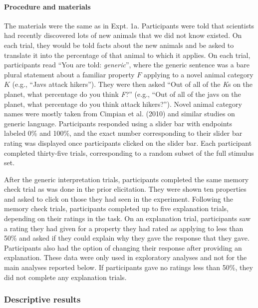 \documentclass[floatsintext,doc]{apa6}
\let\oldparagraph\paragraph
\renewcommand{\paragraph}[1]{\oldparagraph{#1}\mbox{}}
\begin{document}
\hypertarget{procedure-and-materials-2}{%
\paragraph{Procedure and materials}\label{procedure-and-materials-2}}
%
The materials were the same as in Expt. 1a.
Participants were told that scientists had recently discovered lots of new animals that we did not know existed.
On each trial, they would be told facts about the new animals and be asked to translate it into the percentage of that animal to which it applies.
On each trial, participants read \enquote{You are told: \emph{generic}}, where the generic sentence was a bare plural statement about a familiar property \(F\) applying to a novel animal category \(K\) (e.g., \enquote{Javs attack hikers}).
They were then asked \enquote{Out of all of the \emph{K}s on the planet, what percentage do you think \emph{F}?} (e.g., \enquote{Out of all of the javs on the planet, what percentage do you think attack hikers?}).
Novel animal category names were mostly taken from Cimpian et al. (2010) and similar studies on generic language.
Participants responded using a slider bar with endpoints labeled 0\% and 100\%, and the exact number corresponding to their slider bar rating was displayed once participants clicked on the slider bar.
Each participant completed thirty-five trials, corresponding to a random subset of the full stimulus set.

After the generic interpretation trials, participants completed the same memory check trial as was done in the prior elicitation.
They were shown ten properties and asked to click on those they had seen in the experiment.
Following the memory check trials, participants completed up to five explanation trials, depending on their ratings in the task.
On an explanation trial, participants saw a rating they had given for a property they had rated as applying to less than 50\% and asked if they could explain why they gave the response that they gave.
Participants also had the option of changing their response after providing an explanation.
These data were only used in exploratory analyses and not for the main analyses reported below.
If participants gave no ratings less than 50\%, they did not complete any explanation trials.

\hypertarget{descriptive-results}{%
\subsubsection{Descriptive results}\label{descriptive-results}}
\end{document}
